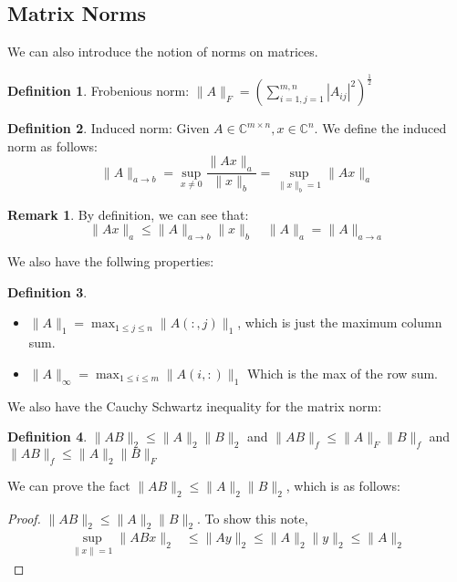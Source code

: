 \documentclass[11pt]{article}
\theoremstyle{definition}
\newtheorem{definition}{Definition}[section]
\newtheorem{remark}{Remark}[section]
\newcommand{\C}{\mathbb{C}}
\begin{document}
\subsection{Matrix Norms}
We can also introduce the notion of norms on matrices. 
\begin{definition}
  Frobenious norm: $\|A \|_F = \left( \sum_{i = 1, j = 1}^{m, n} |A_{ij}|^2 \right)^\frac{1}{2}$
\end{definition}
\begin{definition}
  Induced norm: Given $A \in \C^{m \times n }, x \in \C^n$. We define the induced norm as follows:
  \[
  \|A \|_{a \to b} = \sup_{x \neq 0} \frac{\|Ax\|_a}{\|x\|_b} = \sup_{\|x\|_b = 1} \|Ax \|_a
  \]
\end{definition}
\begin{remark}
  By definition, we can see that: 
  \[
  \|Ax \|_a \leq \|A\|_{a \to b} \|x\|_b \quad \|A\|_a = \|A\|_{a \to a}
  \]
\end{remark}
We also have the follwing properties:
\begin{definition}
  \begin{itemize}
    \item $\|A\|_1 = \max_{1 \leq j \leq n} \| A(:,j)\|_1$, which is just the maximum column sum.
    \item $\|A\|_\infty = \max_{1 \leq i \leq m} \|A(i, :)\|_1$  Which is the max of the row sum. 
  \end{itemize}
\end{definition}
We also have the Cauchy Schwartz inequality for the matrix norm:
\begin{definition}
  $\|AB\|_2 \leq \|A\|_2 \|B\|_2$ and $\|AB\|_f \leq \|A\|_F\|B\|_f$ and $\|AB\|_f \leq \|A\|_2 \|B\|_F$
\end{definition}
We can prove the fact $\|AB\|_2 \leq \|A\|_2 \|B\|_2$, which is as follows:
\begin{proof}
  $\|AB\|_2 \leq \|A\|_2 \|B\|_2$. To show this note, 
  \begin{align*}
    \sup_{\|x \| = 1} \|ABx\|_2 & \leq \|Ay\|_2 \leq \| A\|_2 \|y\|_2 \leq \|A\|_2 
  \end{align*}
\end{proof}
\end{document}
